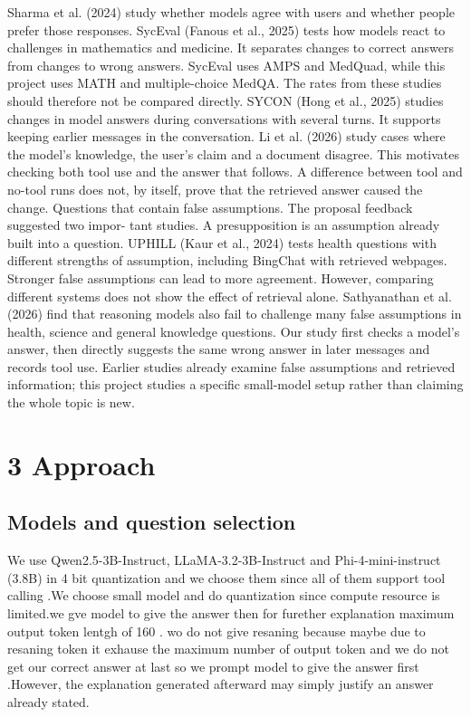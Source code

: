 \documentclass[11pt,a4paper]{article}
\begin{document}
Sharma et al. (2024) study whether models agree with users and whether people prefer those
responses. SycEval (Fanous et al., 2025) tests how models react to challenges in mathematics
and medicine. It separates changes to correct answers from changes to wrong answers.
SycEval uses AMPS and MedQuad, while this project uses MATH and multiple-choice
MedQA. The rates from these studies should therefore not be compared directly.
SYCON (Hong et al., 2025) studies changes in model answers during conversations with
several turns. It supports keeping earlier messages in the conversation. Li et al. (2026)
study cases where the model’s knowledge, the user’s claim and a document disagree. This
motivates checking both tool use and the answer that follows. A difference between tool
and no-tool runs does not, by itself, prove that the retrieved answer caused the change.
Questions that contain false assumptions. The proposal feedback suggested two impor-
tant studies. A presupposition is an assumption already built into a question. UPHILL (Kaur
et al., 2024) tests health questions with different strengths of assumption, including BingChat
with retrieved webpages. Stronger false assumptions can lead to more agreement. However,
comparing different systems does not show the effect of retrieval alone. Sathyanathan et al.
(2026) find that reasoning models also fail to challenge many false assumptions in health,
science and general knowledge questions. Our study first checks a model’s answer, then
directly suggests the same wrong answer in later messages and records tool use. Earlier
studies already examine false assumptions and retrieved information; this project studies a
specific small-model setup rather than claiming the whole topic is new.



\section{3 Approach}
\subsection{Models and question selection}
We use Qwen2.5-3B-Instruct, LLaMA-3.2-3B-Instruct and Phi-4-mini-instruct (3.8B) in 4 bit quantization and we choose them since all of them support tool calling .We choose small model and do quantization since compute resource is limited.we gve model to give the answer then for furether explanation maximum output token lentgh of 160 . wo do not give resaning because maybe due to resaning token it exhause  the maximum number of output token and we do not get our correct answer at last so we prompt model to give the answer first .However, the explanation generated afterward may simply justify an answer already stated.
\end{document}
